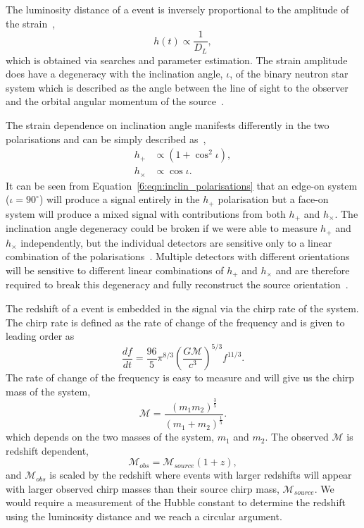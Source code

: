 The luminosity distance of a \gwadj event is inversely proportional to the amplitude of the \gwadj strain~\cite{Schutz:1986},%
\begin{equation}
    h(t) \propto \frac{1}{D_{L}} , 
\end{equation}
%
which is obtained via \gwadj searches and parameter estimation. The \gwadj strain amplitude does have a degeneracy with the inclination angle, $\iota$, of the binary neutron star system which is described as the angle between the line of sight to the observer and the orbital angular momentum of the source~\cite{inclin_degen_2:2019}.

The \gwadj strain dependence on inclination angle manifests differently in the two \gwadj polarisations and can be simply described as~\cite{inclin_degen:2018},
%
\begin{align}
    h_{+} &\propto \left(1+\cos^{2}\iota\right), \\
    h_{\times} &\propto \cos\iota .
    \label{6:eqn:inclin_polarisations}
\end{align}
%
It can be seen from Equation~\ref{6:eqn:inclin_polarisations} that an edge-on system ($\iota = 90^{\circ}$) will produce a signal entirely in the $h_{+}$ polarisation but a face-on system will produce a mixed signal with contributions from both $h_{+}$ and $h_{\times}$. The inclination angle degeneracy could be broken if we were able to measure $h_{+}$ and $h_{\times}$ independently, but the individual \gwadj detectors are sensitive only to a linear combination of the polarisations~\cite{aLIGO:2015}. Multiple \gwadj detectors with different orientations will be sensitive to different linear combinations of $h_{+}$ and $h_{\times}$ and are therefore required to break this degeneracy and fully reconstruct the source orientation~\cite{inclin_degen_2:2019}.

The redshift of a \gwadj event is embedded in the \gwadj signal via the chirp rate of the system. The chirp rate is defined as the rate of change of the \gwadj frequency and is given to leading order as~\cite{Jaranowski:2009}
%
\begin{equation}
    \frac{df}{dt} = \frac{96}{5} \pi^{8/3} \left(\frac{G\mathcal{M}}{c^{3}}\right)^{5/3} f^{11/3}.
    \label{6:eq:chirp_rate}
\end{equation}
%
The rate of change of the \gwadj frequency is easy to measure and will give us the chirp mass of the system,
%
\begin{equation}
    \mathcal{M} = \frac{(m_1 m_2)^{\frac{3}{5}}}{(m_1 + m_2)^{\frac{1}{5}}}.
    \label{6:eq:mchirp}
\end{equation}
%
which depends on the two masses of the system, $m_{1}$ and $m_{2}$. The observed $\mathcal{M}$ is redshift dependent,
%
\begin{equation}
    \mathcal{M}_{obs} = \mathcal{M}_{source}(1 + z), 
    \label{6:eq:mchirp_obs}
\end{equation}
%
and $\mathcal{M}_{obs}$ is scaled by the redshift where events with larger redshifts will appear with larger observed chirp masses than their source chirp mass, $\mathcal{M}_{source}$. We would require a measurement of the Hubble constant to determine the redshift using the luminosity distance and we reach a circular argument.

